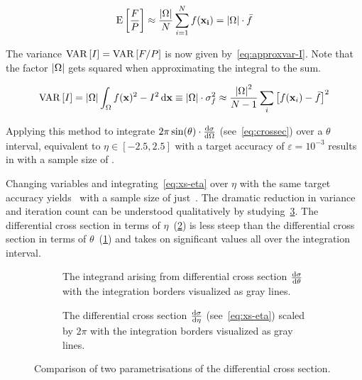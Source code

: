 \begin{equation}
  \label{eq:approxexp-uniform}
  \operatorname{E}\qty[\frac{F}{P}] \approx
  \frac{\abs{\Omega}}{N}\sum_{i=1}^N f(\vb{x_i}) = \abs{\Omega}\cdot\bar{f}
\end{equation}

The variance \(\operatorname{VAR}\qty[I]=\operatorname{VAR}\qty[F/P]\) is now given
by~\ref{eq:approxvar-I}. Note that the factor \(\abs{\Omega}\) gets
squared when approximating the integral to the sum.

\begin{equation}
  \label{eq:approxvar-I}
  \operatorname{VAR}\qty[I] = \abs{\Omega}\int_\Omega f(\vb{x})^2 -
  I^2 \dd{\vb{x}} \equiv \abs{\Omega}\cdot\sigma_f^2 \approx
  \frac{\abs{\Omega}^2}{N-1}\sum_{i}\qty[f(\vb{x}_i) - \bar{f}]^2
\end{equation}

Applying this method to integrate
\(2\pi\sin(\theta)\cdot\dv{\sigma}{\Omega}\) (see~\eqref{eq:crossec})
over a \(\theta\) interval, equivalent to \(\eta\in [-2.5, 2.5]\) with
a target accuracy of \(\varepsilon=10^{-3}\) results in
 with a sample size of
.

Changing variables and integrating~\eqref{eq:xs-eta} over \(\eta\)
with the same target accuracy yields~ with
a sample size of just~. The dramatic
reduction in variance and iteration count can be understood
qualitatively by studying~\ref{fig:xs-int-comp}. The differential
cross section in terms of \(\eta\)~(\ref{fig:xs-int-eta}) is less
steep than the differential cross section in terms of
\(\theta\)~(\ref{fig:xs-int-theta}) and takes on significant values
all over the integration interval.

\begin{figure}[ht]
  \centering
  \begin{subfigure}[c]{.49\textwidth}
    \caption[\(2\pi\dv{\sigma}{\theta}\) with integration
    boundaries]{\label{fig:xs-int-theta} The integrand arising from
      differential cross section \(\dv{\sigma}{\theta}\) with the
      integration borders visualized as gray lines.}
  \end{subfigure}
  \begin{subfigure}[c]{.49\textwidth}
    \caption[\(2\pi\dv{\sigma}{\eta}\) with integration
    boundaries]{\label{fig:xs-int-eta} The differential cross section
      \(\dv{\sigma}{\eta}\) (see~\ref{eq:xs-eta}) scaled by \(2\pi\)
      with the integration borders visualized as gray lines.}
  \end{subfigure}
  \caption{\label{fig:xs-int-comp} Comparison of two parametrisations of the differential cross
  section.}
\end{figure}

